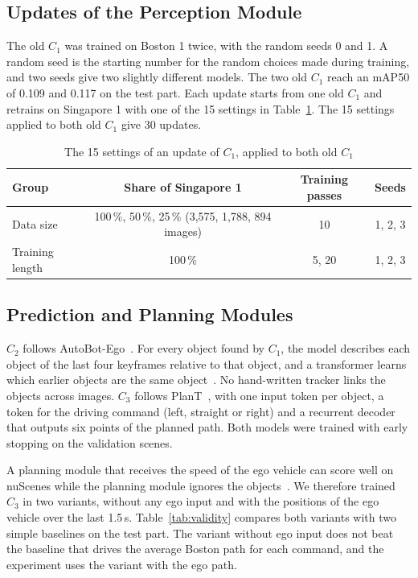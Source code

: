 \documentclass[11pt,a4paper]{article}
\begin{document}
\subsection{Updates of the Perception Module}

The old $C_1$ was trained on Boston 1 twice, with the random seeds 0 and 1. A
random seed is the starting number for the random choices made during
training, and two seeds give two slightly different models. The two old
$C_1$ reach an mAP50 of 0.109 and 0.117 on the test part. Each update starts
from one old $C_1$ and retrains on Singapore 1 with one of the 15 settings
in Table~\ref{tab:updates}. The 15 settings applied to both old $C_1$ give 30
updates.

\begin{table}[h!]
\centering
\caption{The 15 settings of an update of $C_1$, applied to both old $C_1$}
\label{tab:updates}
\small
\renewcommand{\arraystretch}{1.25}
\begin{tabular}{@{}lccc@{}}
\toprule
\textbf{Group} & \textbf{Share of Singapore 1} & \textbf{Training passes} & \textbf{Seeds} \\
\midrule
Data size & 100\,\%, 50\,\%, 25\,\% (3{,}575, 1{,}788, 894 images) & 10 & 1, 2, 3 \\
Training length & 100\,\% & 5, 20 & 1, 2, 3 \\
\bottomrule
\end{tabular}
\end{table}

\subsection{Prediction and Planning Modules}

$C_2$ follows AutoBot-Ego~\cite{girgis2022autobots}. For every object found by
$C_1$, the model describes each object of the last four keyframes relative to
that object, and a transformer learns which earlier objects are the same
object~\cite{weng2022whose}. No hand-written tracker links the objects across
images. $C_3$ follows PlanT~\cite{renz2022plant}, with one input token per
object, a token for the driving command (left, straight or right) and a
recurrent decoder that outputs six points of the planned path. Both models
were trained with early stopping on the validation scenes.

A planning module that receives the speed of the ego vehicle can score well on
nuScenes while the planning module ignores the
objects~\cite{zhai2023rethinking,li2024egostatus}. We therefore trained $C_3$
in two variants, without any ego input and with the positions of the ego
vehicle over the last 1.5\,s. Table~\ref{tab:validity} compares both variants
with two simple baselines on the test part. The variant without ego input does
not beat the baseline that drives the average Boston path for each command,
and the experiment uses the variant with the ego path.
\end{document}
